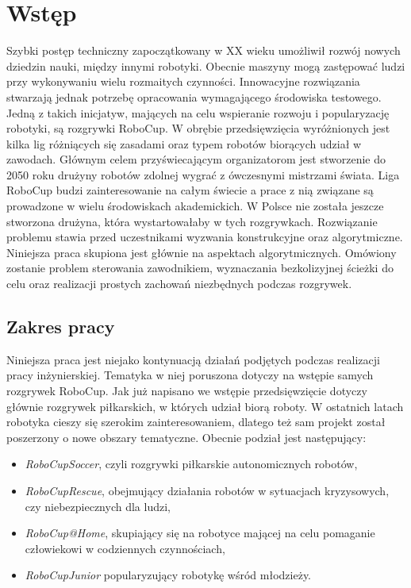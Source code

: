 \chapter[Wstęp ]{Wstęp}
Szybki postęp techniczny zapoczątkowany w XX wieku umożliwił rozwój nowych dziedzin nauki, między innymi robotyki. Obecnie maszyny mogą zastępować ludzi przy wykonywaniu wielu rozmaitych czynności.
Innowacyjne rozwiązania stwarzają jednak potrzebę opracowania wymagającego środowiska testowego. Jedną z takich inicjatyw, mających na celu wspieranie rozwoju i popularyzację robotyki, są rozgrywki
RoboCup. W obrębie przedsięwzięcia wyróżnionych jest kilka lig różniących się zasadami oraz typem robotów biorących udział w zawodach.
Głównym celem przyświecającym organizatorom jest stworzenie do 2050 roku drużyny robotów zdolnej wygrać z ówczesnymi mistrzami świata.
Liga RoboCup budzi zainteresowanie na całym świecie a prace z nią związane  są prowadzone w wielu środowiskach akademickich.
W Polsce nie została jeszcze stworzona drużyna, która wystartowałaby w tych rozgrywkach.
Rozwiązanie problemu stawia przed uczestnikami wyzwania konstrukcyjne oraz algorytmiczne. Niniejsza praca skupiona jest głównie na aspektach algorytmicznych. Omówiony zostanie problem sterowania
zawodnikiem, wyznaczania bezkolizyjnej ścieżki do celu oraz realizacji prostych zachowań niezbędnych podczas rozgrywek.
\section{Zakres pracy}
Niniejsza praca jest niejako kontynuacją działań podjętych podczas realizacji pracy inżynierskiej. Tematyka w niej poruszona dotyczy na wstępie samych rozgrywek RoboCup. Jak już napisano we 
wstępie przedsięwzięcie dotyczy głównie rozgrywek piłkarskich, w których udział biorą roboty. W ostatnich latach robotyka cieszy się szerokim zainteresowaniem, dlatego też sam projekt
został poszerzony o nowe obszary tematyczne.
Obecnie podział jest następujący:
\begin{itemize}
	\item \emph{RoboCupSoccer}, czyli rozgrywki piłkarskie autonomicznych robotów,
	\item \emph{RoboCupRescue}, obejmujący działania robotów w sytuacjach kryzysowych, czy niebezpiecznych dla ludzi,
	\item \emph{RoboCup@Home}, skupiający się na robotyce mającej na celu pomaganie człowiekowi w codziennych czynnościach,
	\item \emph{RoboCupJunior} popularyzujący robotykę wśród młodzieży.
\end{itemize}


